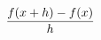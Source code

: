 \documentclass[preview]{standalone}
\begin{document}
\begin{align*}
\special{dvisvgm:raw <g id='unique000'>}\frac{f(x+h)-f(x)}{h}\special{dvisvgm:raw </g>}
\end{align*}
\end{document}
